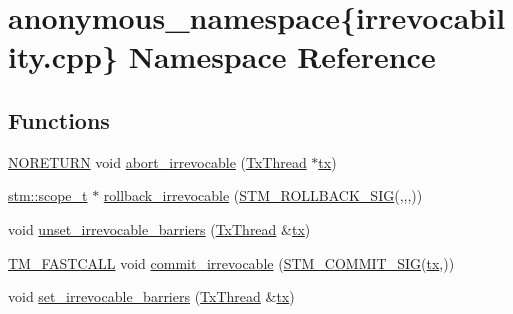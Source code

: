 \hypertarget{namespaceanonymous__namespace_02irrevocability_8cpp_03}{\section{anonymous\-\_\-namespace\{irrevocability.\-cpp\} Namespace Reference}
\label{namespaceanonymous__namespace_02irrevocability_8cpp_03}
}
\subsection*{Functions}
\begin{DoxyCompactItemize}
\item 
\hyperlink{platform_8hpp_aa1728270d73c5d1598de1fd691762eb1}{N\-O\-R\-E\-T\-U\-R\-N} void \hyperlink{namespaceanonymous__namespace_02irrevocability_8cpp_03_ac71fd4f2ae60b1814ccaedea40d424a2}{abort\-\_\-irrevocable} (\hyperlink{structstm_1_1TxThread}{Tx\-Thread} $\ast$\hyperlink{stmskip_8cc_a0f1c58699b83ce5a08bd9ee859250d72}{tx})
\item 
\hyperlink{namespacestm_a91badf88c88aacc831b01a315435a255}{stm\-::scope\-\_\-t} $\ast$ \hyperlink{namespaceanonymous__namespace_02irrevocability_8cpp_03_adfdb44f5b204ddd367543d1e3a5465fc}{rollback\-\_\-irrevocable} (\hyperlink{include_2stm_2macros_8hpp_a1c36a48149c84f90d5bca01019950ca9}{S\-T\-M\-\_\-\-R\-O\-L\-L\-B\-A\-C\-K\-\_\-\-S\-I\-G}(,,,))
\item 
void \hyperlink{namespaceanonymous__namespace_02irrevocability_8cpp_03_ab42770392de26e3b0bc1ffbe2f7932b8}{unset\-\_\-irrevocable\-\_\-barriers} (\hyperlink{structstm_1_1TxThread}{Tx\-Thread} \&\hyperlink{stmskip_8cc_a0f1c58699b83ce5a08bd9ee859250d72}{tx})
\item 
\hyperlink{platform_8hpp_a8b5d728e6eed8f368f9966f637d2f719}{T\-M\-\_\-\-F\-A\-S\-T\-C\-A\-L\-L} void \hyperlink{namespaceanonymous__namespace_02irrevocability_8cpp_03_af9e6aae425588bac29be16e10b91cd4c}{commit\-\_\-irrevocable} (\hyperlink{include_2stm_2macros_8hpp_a1b8304eb1082517c7dc31f3534b72343}{S\-T\-M\-\_\-\-C\-O\-M\-M\-I\-T\-\_\-\-S\-I\-G}(\hyperlink{stmskip_8cc_a0f1c58699b83ce5a08bd9ee859250d72}{tx},))
\item 
void \hyperlink{namespaceanonymous__namespace_02irrevocability_8cpp_03_a5f2e3da55eda99c9e30b6314c36ed8b2}{set\-\_\-irrevocable\-\_\-barriers} (\hyperlink{structstm_1_1TxThread}{Tx\-Thread} \&\hyperlink{stmskip_8cc_a0f1c58699b83ce5a08bd9ee859250d72}{tx})
\end{DoxyCompactItemize}
